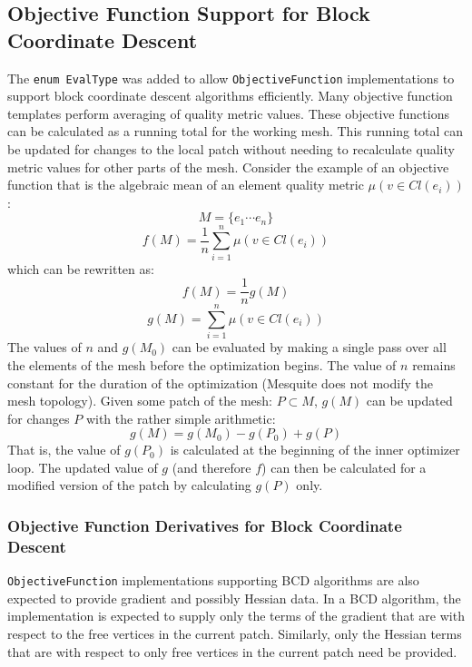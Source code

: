 \documentclass{article}
\begin{document}
\subsection{Objective Function Support for Block Coordinate Descent}

The \texttt{enum EvalType} was added to allow \texttt{ObjectiveFunction} implementations to support block coordinate descent algorithms efficiently.  Many objective function templates perform averaging of quality metric values.  These objective functions can be calculated as a running total for the working mesh.  This running total can be updated for changes to the local patch without needing to recalculate quality metric values for other parts of the mesh.  Consider the example of an objective function that is the algebraic mean of an element quality metric $\mu(v \in Cl(e_i))$:
\begin{displaymath}
M = \{ e_1 \cdots e_n \}
\end{displaymath}
\begin{displaymath}
f(M) = \frac{1}{n}\sum_{i=1}^{n}\mu(v \in Cl(e_i))
\end{displaymath}
which can be rewritten as:
\begin{displaymath}
f(M) = \frac{1}{n}g(M)
\end{displaymath}
\begin{displaymath}
g(M) = \sum_{i=1}^{n}\mu(v \in Cl(e_i))
\end{displaymath}
The values of $n$ and $g(M_0)$ can be evaluated by making a single pass over all the elements of the mesh before the optimization begins.  The value of $n$ remains constant for the duration of the optimization (Mesquite does not modify the mesh topology).  Given some patch of the mesh: $P \subset M$, $g(M)$ can be updated for changes $P$ with the rather simple arithmetic:
\begin{displaymath}
g(M) = g(M_0) - g(P_0) + g(P)
\end{displaymath}
That is, the value of $g(P_0)$ is calculated at the beginning of the inner optimizer loop.  The updated value of $g$ (and therefore $f$) can then be calculated for a modified version of the patch by calculating $g(P)$ only.


\subsubsection{Objective Function Derivatives for Block Coordinate Descent}

\texttt{ObjectiveFunction} implementations supporting BCD algorithms are also expected to provide gradient and possibly Hessian data.  In a BCD algorithm, the implementation is expected to supply only the terms of the gradient that are with respect to the free vertices in the current patch.  Similarly, only the Hessian terms that are with respect to only free vertices in the current patch need be provided.  
\end{document}
